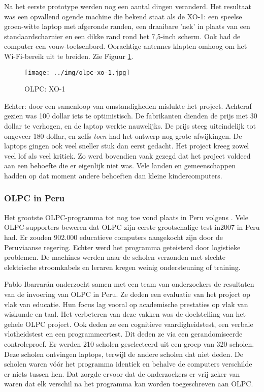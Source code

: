 Na het eerste prototype werden nog een aantal dingen veranderd. Het resultaat was een opvallend ogende machine die bekend staat als de XO-1: een speelse groen-witte laptop met afgeronde randen, een draaibare 'nek' in plaats van een standaardscharnier en een dikke rand rond het 7,5-inch scherm. Ook had de computer een vouw-toetsenbord. Oorachtige antennes klapten omhoog om het Wi-Fi-bereik uit te breiden. Zie Figuur \ref{xo-1}. \autocite{Robertson2018}

 \begin{figure}[h!]
	\texttt{[image: ../img/olpc-xo-1.jpg]}
	\caption{OLPC: XO-1}
	\label{xo-1}
\end{figure}

Echter: door een samenloop van omstandigheden mislukte het project. Achteraf gezien was 100 dollar iets te optimistisch. De fabrikanten dienden de prijs met 30 dollar te verhogen, en de laptop werkte nauwelijks. De prijs steeg uiteindelijk tot ongeveer 180 dollar, en zelfs \textit{toen} had het ontwerp nog grote afwijkingen. De laptops gingen ook veel sneller stuk dan eerst gedacht. Het project kreeg zowel veel lof als veel kritiek. Zo werd bovendien vaak gezegd dat het project voldeed aan een behoefte die er eigenlijk niet was. Vele landen en gemeenschappen hadden op dat moment andere behoeften dan kleine kindercomputers. \autocite{Robertson2018}

\subsubsection{OLPC in Peru}
Het grootste OLPC-programma tot nog toe vond plaats in Peru volgens \autocite{Trucano2012}. Vele OLPC-supporters beweren dat OLPC zijn eerste grootschalige test in2007 in Peru had. Er zouden 902.000 educatieve computers aangekocht zijn door de Peruviaanse regering. Echter werd het programma geteisterd door logistieke problemen. De machines werden naar de scholen verzonden met slechte elektrische stroomkabels en leraren kregen weinig ondersteuning of training. \autocite{Robertson2018}

Pablo Ibarrarán onderzocht samen met een team van onderzoekers de resultaten van de invoering van OLPC in Peru. \autocite{Ibarraran2012} Ze deden een evaluatie van het project op vlak van educatie. Hun focus lag vooral op academische prestaties op vlak van wiskunde en taal. Het verbeteren van deze vakken was de doelstelling van het gehele OLPC project. Ook deden ze een cognitieve vaardigheidstest, een verbale vlotheidstest en een programmeertest. Dit deden ze via een gerandomiseerde controleproef. Er werden 210 scholen geselecteerd uit een groep van 320 scholen. Deze scholen ontvingen laptops, terwijl de andere scholen dat niet deden. De scholen waren vóór het programma identiek en behalve de computers verschilde er niets tussen hen. Dat zorgde ervoor dat de onderzoekers er vrij zeker van waren dat elk verschil na het programma kan worden toegeschreven aan OLPC. \autocite{Ibarraran2012}

